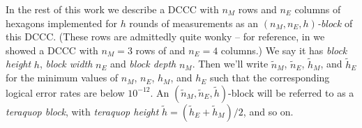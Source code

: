 In the rest of this work we describe a DCCC with $n_M$ rows and $n_E$ columns of hexagons implemented for $h$ rounds of measurements as an \textit{$(n_M, n_E, h)$-block} of this DCCC.
(These rows are admittedly quite wonky -- for reference, in  we showed a DCCC with $n_M = 3$ rows of and $n_E = 4$ columns.)
We say it has \textit{block height} $h$, \textit{block width} $n_E$ and \textit{block depth} $n_M$.
Then we'll write $\tilde{n}_M$, $\tilde{n}_E$, $\tilde{h}_M$, and $\tilde{h}_E$ for the minimum values of $n_M$, $n_E$, $h_M$, and $h_E$ such that the corresponding logical error rates are below $10^{-12}$.
An $(\tilde{n}_M, \tilde{n}_E, \tilde{h})$-block will be referred to as a \textit{teraquop block},
with \textit{teraquop height} $\tilde{h} = (\tilde{h}_E + \tilde{h}_M)/2$, and so on.